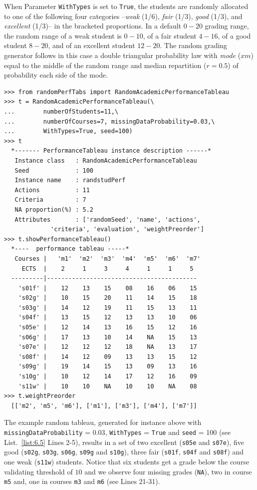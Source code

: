 When Parameter \texttt{WithTypes} is set to \texttt{True}, the students are randomly allocated to one of the following four categories --\emph{weak} (1/6), \emph{fair} (1/3), \emph{good} (1/3), and \emph{excellent} (1/3)-- in the bracketed proportions. In a default $0-20$ grading range, the random range of a weak student is $0-10$, of a fair student $4-16$, of a good student $8-20$, and of an excellent student $12-20$. The random grading generator follows in this case a double triangular probability law with \emph{mode} ($xm$) equal to the middle of the random range and median repartition ($r = 0.5$) of probability each side of the mode.
\begin{lstlisting}[caption={Generating a random academic performance tableau},label=list:6.5]
>>> from randomPerfTabs import RandomAcademicPerformanceTableau
>>> t = RandomAcademicPerformanceTableau(\
...        numberOfStudents=11,\
...        numberOfCourses=7, missingDataProbability=0.03,\
...        WithTypes=True, seed=100)
>>> t
  *------- PerformanceTableau instance description ------*
   Instance class   : RandomAcademicPerformanceTableau
   Seed             : 100
   Instance name    : randstudPerf
   Actions          : 11
   Criteria         : 7
   NA proportion(%) : 5.2
   Attributes       : ['randomSeed', 'name', 'actions',
             'criteria', 'evaluation', 'weightPreorder']
>>> t.showPerformanceTableau()
  *----  performance tableau -----*
   Courses |   'm1'  'm2'  'm3'  'm4'  'm5'  'm6'  'm7' 
     ECTS  |    2     1     3     4     1     1     5    
  ---------|------------------------------------------
    's01f' |    12    13    15    08    16    06    15   
    's02g' |    10    15    20    11    14    15    18   
    's03g' |    14    12    19    11    15    13    11   
    's04f' |    13    15    12    13    13    10    06   
    's05e' |    12    14    13    16    15    12    16   
    's06g' |    17    13    10    14    NA    15    13   
    's07e' |    12    12    12    18    NA    13    17   
    's08f' |    14    12    09    13    13    15    12   
    's09g' |    19    14    15    13    09    13    16   
    's10g' |    10    12    14    17    12    16    09   
    's11w' |    10    10    NA    10    10    NA    08
>>> t.weightPreorder
  [['m2', 'm5', 'm6'], ['m1'], ['m3'], ['m4'], ['m7']]
\end{lstlisting}
  
The example random tableau, generated for instance above with \texttt{missingData\-Proba\-bility} = $0.03$, \texttt{WithTypes} = \texttt{True} and \texttt{seed} = 100 (see List.~\vref{list:6.5} Lines 2-5), results in a set of two excellent (\texttt{s05e} and \texttt{s07e}), five good (\texttt{s02g}, \texttt{s03g}, \texttt{s06g}, \texttt{s09g} and \texttt{s10g}), three fair (\texttt{s01f}, \texttt{s04f} and \texttt{s08f}) and one weak (\texttt{s11w}) students. Notice that six students get a grade below the course validating threshold of $10$ and we observe four missing grades (\texttt{NA}), two in course \texttt{m5} and, one in courses \texttt{m3} and \texttt{m6} (see Lines 21-31).

